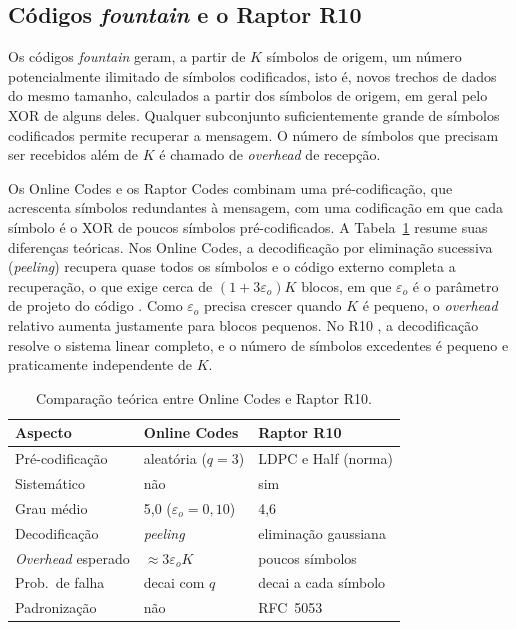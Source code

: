 \documentclass[portuguese]{sbc2025}%
\begin{document}
\subsection{Códigos \emph{fountain} e o Raptor R10}

Os códigos \emph{fountain} geram, a partir de $K$ símbolos de origem, um número potencialmente ilimitado de símbolos codificados, isto é, novos trechos de dados do mesmo tamanho, calculados a partir dos símbolos de origem, em geral pelo XOR de alguns deles. Qualquer subconjunto suficientemente grande de símbolos codificados permite recuperar a mensagem. O número de símbolos que precisam ser recebidos além de $K$ é chamado de \emph{overhead} de recepção.

Os Online Codes \citep{maymounkov2002online} e os Raptor Codes combinam uma pré-codificação, que acrescenta símbolos redundantes à mensagem, com uma codificação em que cada símbolo é o XOR de poucos símbolos pré-codificados. A Tabela~\ref{tab:teorica} resume suas diferenças teóricas. Nos Online Codes, a decodificação por eliminação sucessiva (\emph{peeling}) recupera quase todos os símbolos e o código externo completa a recuperação, o que exige cerca de $(1 + 3\varepsilon_o)K$ blocos, em que $\varepsilon_o$ é o parâmetro de projeto do código \citep{maymounkov2002online}. Como $\varepsilon_o$ precisa crescer quando $K$ é pequeno, o \emph{overhead} relativo aumenta justamente para blocos pequenos. No R10 \citep{luby2007rfc5053}, a decodificação resolve o sistema linear completo, e o número de símbolos excedentes é pequeno e praticamente independente de $K$.

\begin{table}[t]
	\centering
	\caption{Comparação teórica entre Online Codes e Raptor R10.}
	\label{tab:teorica}
	\footnotesize
	\begin{tabular}{@{}lll@{}}
		\toprule
		\textbf{Aspecto} & \textbf{Online Codes} & \textbf{Raptor R10} \\
		\midrule
		Pré-codificação & aleatória ($q = 3$) & LDPC e Half (norma) \\
		Sistemático & não & sim \\
		Grau médio & 5,0 ($\varepsilon_o = 0{,}10$) & 4,6 \\
		Decodificação & \emph{peeling} & eliminação gaussiana \\
		\emph{Overhead} esperado & $\approx 3\varepsilon_o K$ & poucos símbolos \\
		Prob.\ de falha & decai com $q$ & decai a cada símbolo \\
		Padronização & não & RFC~5053 \\
		\bottomrule
	\end{tabular}
\end{table}
\end{document}
